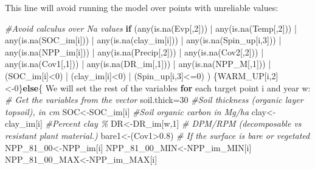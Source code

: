 \documentclass[
  10pt,
  b5paper,
]{book}
\newenvironment{Shaded}{\begin{snugshade}}{\end{snugshade}}
\newcommand{\CommentTok}[1]{\textcolor[rgb]{0.56,0.35,0.01}{\textit{#1}}}
\newcommand{\ControlFlowTok}[1]{\textcolor[rgb]{0.13,0.29,0.53}{\textbf{#1}}}
\newcommand{\DecValTok}[1]{\textcolor[rgb]{0.00,0.00,0.81}{#1}}
\newcommand{\FloatTok}[1]{\textcolor[rgb]{0.00,0.00,0.81}{#1}}
\newcommand{\FunctionTok}[1]{\textcolor[rgb]{0.00,0.00,0.00}{#1}}
\newcommand{\NormalTok}[1]{#1}
\newcommand{\OtherTok}[1]{\textcolor[rgb]{0.56,0.35,0.01}{#1}}
\newcommand{\SpecialCharTok}[1]{\textcolor[rgb]{0.00,0.00,0.00}{#1}}
\begin{document}
This line will avoid running the model over points with unreliable values:

\begin{Shaded}
\begin{Highlighting}[]
\CommentTok{\#Avoid calculus over Na values }
\ControlFlowTok{if}\NormalTok{ (}\FunctionTok{any}\NormalTok{(}\FunctionTok{is.na}\NormalTok{(Evp[,}\DecValTok{2}\NormalTok{])) }\SpecialCharTok{|} \FunctionTok{any}\NormalTok{(}\FunctionTok{is.na}\NormalTok{(Temp[,}\DecValTok{2}\NormalTok{])) }\SpecialCharTok{|} \FunctionTok{any}\NormalTok{(}\FunctionTok{is.na}\NormalTok{(SOC\_im[i])) }\SpecialCharTok{|} \FunctionTok{any}\NormalTok{(}\FunctionTok{is.na}\NormalTok{(clay\_im[i])) }\SpecialCharTok{|} \FunctionTok{any}\NormalTok{(}\FunctionTok{is.na}\NormalTok{(Spin\_up[i,}\DecValTok{3}\NormalTok{]))  }\SpecialCharTok{|} \FunctionTok{any}\NormalTok{(}\FunctionTok{is.na}\NormalTok{(NPP\_im[i])) }\SpecialCharTok{|} \FunctionTok{any}\NormalTok{(}\FunctionTok{is.na}\NormalTok{(Precip[,}\DecValTok{2}\NormalTok{]))  }\SpecialCharTok{|}  \FunctionTok{any}\NormalTok{(}\FunctionTok{is.na}\NormalTok{(Cov2[,}\DecValTok{2}\NormalTok{]))  }\SpecialCharTok{|}  \FunctionTok{any}\NormalTok{(}\FunctionTok{is.na}\NormalTok{(Cov1[,}\DecValTok{1}\NormalTok{]))  }\SpecialCharTok{|} \FunctionTok{any}\NormalTok{(}\FunctionTok{is.na}\NormalTok{(DR\_im[,}\DecValTok{1}\NormalTok{]))  }\SpecialCharTok{|} \FunctionTok{any}\NormalTok{(}\FunctionTok{is.na}\NormalTok{(NPP\_M[,}\DecValTok{1}\NormalTok{]))  }\SpecialCharTok{|}\NormalTok{  (SOC\_im[i]}\SpecialCharTok{\textless{}}\DecValTok{0}\NormalTok{) }\SpecialCharTok{|}\NormalTok{ (clay\_im[i]}\SpecialCharTok{\textless{}}\DecValTok{0}\NormalTok{) }\SpecialCharTok{|}\NormalTok{ (Spin\_up[i,}\DecValTok{3}\NormalTok{]}\SpecialCharTok{\textless{}=}\DecValTok{0}\NormalTok{) ) \{WARM\_UP[i,}\DecValTok{2}\NormalTok{]}\OtherTok{\textless{}{-}}\DecValTok{0}\NormalTok{\}}\ControlFlowTok{else}\NormalTok{\{}
\NormalTok{We will set the rest of the variables }\ControlFlowTok{for}\NormalTok{ each target point i and year w}\SpecialCharTok{:} 
\CommentTok{\# Get the variables from the vector}
\NormalTok{soil.thick}\OtherTok{=}\DecValTok{30}  \CommentTok{\#Soil thickness (organic layer topsoil), in cm}
\NormalTok{SOC}\OtherTok{\textless{}{-}}\NormalTok{SOC\_im[i]      }\CommentTok{\#Soil organic carbon in Mg/ha }
\NormalTok{clay}\OtherTok{\textless{}{-}}\NormalTok{clay\_im[i]        }\CommentTok{\#Percent clay \%}
\NormalTok{DR}\OtherTok{\textless{}{-}}\NormalTok{DR\_im[w,}\DecValTok{1}\NormalTok{]              }\CommentTok{\# DPM/RPM (decomposable vs resistant plant material.)}
\NormalTok{bare1}\OtherTok{\textless{}{-}}\NormalTok{(Cov1}\SpecialCharTok{\textgreater{}}\FloatTok{0.8}\NormalTok{)           }\CommentTok{\# If the surface is bare or vegetated}
\NormalTok{NPP\_81\_00}\OtherTok{\textless{}{-}}\NormalTok{NPP\_im[i]}
\NormalTok{NPP\_81\_00\_MIN}\OtherTok{\textless{}{-}}\NormalTok{NPP\_im\_MIN[i]}
\NormalTok{NPP\_81\_00\_MAX}\OtherTok{\textless{}{-}}\NormalTok{NPP\_im\_MAX[i]}
\end{Highlighting}
\end{Shaded}
\end{document}
